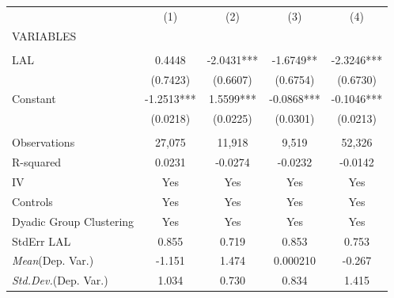 \documentclass[]{article}
\begin{document}
\begin{tabular}{lcccc} \hline
 & (1) & (2) & (3) & (4) \\
VARIABLES &  &  &  &  \\ \hline
 &  &  &  &  \\
LAL & 0.4448 & -2.0431*** & -1.6749** & -2.3246*** \\
 & (0.7423) & (0.6607) & (0.6754) & (0.6730) \\
Constant & -1.2513*** & 1.5599*** & -0.0868*** & -0.1046*** \\
 & (0.0218) & (0.0225) & (0.0301) & (0.0213) \\
 &  &  &  &  \\
Observations & 27,075 & 11,918 & 9,519 & 52,326 \\
R-squared & 0.0231 & -0.0274 & -0.0232 & -0.0142 \\
IV & Yes & Yes & Yes & Yes \\
Controls & Yes & Yes & Yes & Yes \\
Dyadic Group Clustering & Yes & Yes & Yes & Yes \\
StdErr LAL & 0.855 & 0.719 & 0.853 & 0.753 \\
\textit{Mean}(Dep. Var.) & -1.151 & 1.474 & 0.000210 & -0.267 \\
 \textit{Std.Dev.}(Dep. Var.) & 1.034 & 0.730 & 0.834 & 1.415 \\ \hline
\end{tabular}
\end{document}

